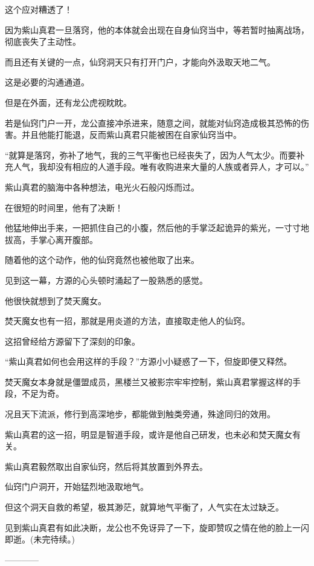 \begin{this_body}
这个应对糟透了！

因为紫山真君一旦落窍，他的本体就会出现在自身仙窍当中，等若暂时抽离战场，彻底丧失了主动性。

而且还有关键的一点，仙窍洞天只有打开门户，才能向外汲取天地二气。

这是必要的沟通通道。

但是在外面，还有龙公虎视眈眈。

若是仙窍门户一开，龙公直接冲杀进来，随意之间，就能对仙窍造成极其恐怖的伤害。并且他能打能退，反而紫山真君只能被困在自家仙窍当中。

“就算是落窍，弥补了地气，我的三气平衡也已经丧失了，因为人气太少。而要补充人气，我却没有相应的人道手段。唯有收购进来大量的人族或者异人，才可以。”

紫山真君的脑海中各种想法，电光火石般闪烁而过。

在很短的时间里，他有了决断！

他猛地伸出手来，一把抓住自己的小腹，然后他的手掌泛起诡异的紫光，一寸寸地拔高，手掌心离开腹部。

随着他的这个动作，他的仙窍竟然也被他取了出来。

见到这一幕，方源的心头顿时涌起了一股熟悉的感觉。

他很快就想到了焚天魔女。

焚天魔女也有一招，那就是用炎道的方法，直接取走他人的仙窍。

这招曾经给方源留下了深刻的印象。

“紫山真君如何也会用这样的手段？”方源小小疑惑了一下，但旋即便又释然。

焚天魔女本身就是僵盟成员，黑楼兰又被影宗牢牢控制，紫山真君掌握这样的手段，不足为奇。

况且天下流派，修行到高深地步，都能做到触类旁通，殊途同归的效用。

紫山真君的这一招，明显是智道手段，或许是他自己研发，也未必和焚天魔女有关。

紫山真君毅然取出自家仙窍，然后将其放置到外界去。

仙窍门户洞开，开始猛烈地汲取地气。

但这个洞天自救的希望，极其渺茫，就算地气平衡了，人气实在太过缺乏。

见到紫山真君有如此决断，龙公也不免讶异了一下，旋即赞叹之情在他的脸上一闪即逝。(未完待续。)

------------

\end{this_body}

